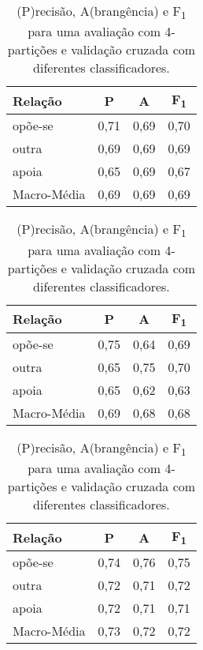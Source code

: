 \documentclass[a4paper, twocolumn, 11pt, twoside]{article}
\begin{document}
\begin{table}
    \begin{subtable}[c]{.5\textwidth}
    \centering
    \begin{tabular}{l ccc}
        {\bf Relação} & {\bf P} & {\bf A} & {\bf F\textsubscript{1}} \\
		\hline
        opõe-se          &  0,71  &  0,69  &  0,70   \\
        outra            &  0,69  &  0,69  &  0,69   \\
        apoia            &  0,65  &  0,69  &  0,67   \\
		\hline
		Macro-Média      &	0,69  &  0,69  &  0,69   \\
    \end{tabular}
    \caption{SVM com um kernel linear.\label{tbl:svmlinearaccuracy}}
    \vspace{5mm}           
    \end{subtable}
\quad%
    \begin{subtable}[c]{.5\textwidth}
    \centering
    \begin{tabular}{l ccc}
        {\bf Relação} & {\bf P} & {\bf A} & {\bf F\textsubscript{1}} \\
		\hline
        opõe-se          &  0,75  &  0,64  &  0,69   \\
        outra            &  0,65  &  0,75  &  0,70   \\
        apoia            &  0,65  &  0,62  &  0,63   \\
		\hline
		Macro-Média      &  0,69  &  0,68  &  0,68   \\
    \end{tabular}
    \caption{LSTM bidireccional.\label{tbl:bilstm}}
    \vspace{5mm}     
    \end{subtable}
\quad%
    \begin{subtable}[c]{.5\textwidth}
    \centering
    \begin{tabular}{l ccc}
        {\bf Relação} & {\bf P} & {\bf A} & {\bf F\textsubscript{1}} \\
		\hline
        opõe-se          &  0,74  &  0,76  &  0,75   \\
        outra            &  0,72  &  0,71  &  0,72   \\
        apoia            &  0,72  &  0,71  &  0,71   \\
		\hline
		Macro-Média      &  0,73  &  0,72  &  0,72   \\
    \end{tabular}
    \caption{DistilBERT pré-treinado em Português.\label{tbl:distilbert}}
    \end{subtable}
  \caption{(P)recisão, A(brangência) e F\textsubscript{1} para uma avaliação com 4-partições e validação cruzada com diferentes classificadores.}
  \label{tab:results_relacao}
\end{table}
\end{document}
